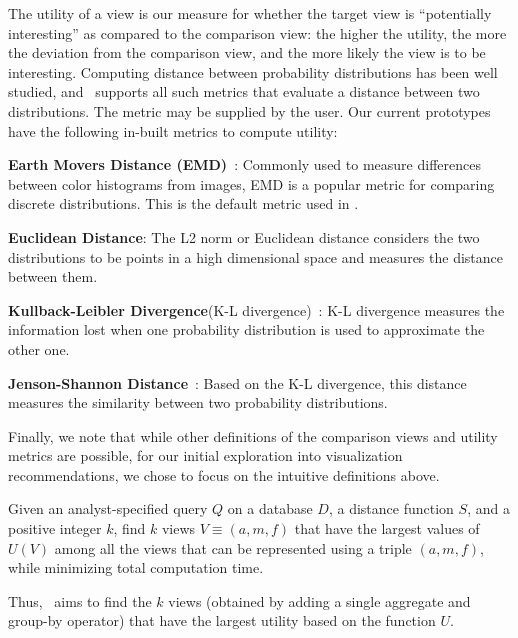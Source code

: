 The utility of a view is our measure for whether the target view is
``potentially interesting'' as compared to the comparison view:
the higher the utility, the more the deviation
from the comparison view, and the more likely the view is to be interesting.
Computing distance between probability distributions has
been well studied, and \VizRecDB\ supports all such
metrics that evaluate a distance between two distributions.
The metric may be supplied by the user.
Our current prototypes have the following in-built metrics
to compute utility:
\squishlist
  \item {\bf Earth Movers Distance (EMD)}~\cite{wikipedia-prob-dist}: Commonly used to
  measure differences between color histograms from images, EMD is a popular metric for comparing
  discrete distributions. This is the default metric used in \VizRecDB.
  \item {\bf Euclidean Distance}: The L2 norm or
  Euclidean distance considers the two distributions to be points in a high
  dimensional space and measures the distance between them.
  \item {\bf Kullback-Leibler Divergence}(K-L divergence)~\cite{wikipedia-KL}:
  K-L divergence measures the information lost when one probability distribution is used to approximate
  the other one.
  \item {\bf Jenson-Shannon Distance}~\cite{wikipedia-JS,entropy-vis}: Based on
  the K-L divergence, this distance measures the similarity between two probability distributions.
\squishend

Finally, we note that while other definitions of the comparison views and
utility metrics are possible, for our initial exploration into 
visualization recommendations, we chose to focus on the intuitive definitions above.

\begin{problem}
\vspace{-5pt}
Given an analyst-specified query $Q$ on a database $D$, a distance function $S$,
and a positive integer $k$, find $k$ views $V \equiv (a, m, f)$ that
have the largest values of $U(V)$ among all the views that can be represented
using a triple $(a, m, f)$, while minimizing total computation time.
\vspace{-5pt}
\end{problem}
Thus, \VizRecDB\ aims to find the $k$ views (obtained by adding a single aggregate
 and group-by operator) that have the largest utility based on the function $U$.

